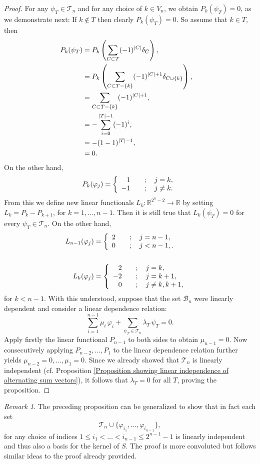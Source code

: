 \documentclass[12pt]{amsart}
\numberwithin{theorem}{section}
\theoremstyle{remark}
\newtheorem{remark}{Remark}[section]
\begin{document}
\begin{proof}
For any $\psi_T\in \mathcal T_n$ and for any choice of $k\in V_n$, we obtain $P_k(\psi_T) = 0$, as we demonstrate next: If $k\notin T$ then clearly $P_k(\psi_T)=0$. So assume that $k\in T$, then 
\begin{align*}
P_k(\psi_T) & = P_k\left(\sum _{C\subset T} (-1)^{|C|} \delta_C  \right), \cr
& = P_k\left(\sum _{C\subset T-\{k\}} (-1)^{|C|+1} \delta_{C\cup\{k\}}  \right), \cr
& = \sum _{C\subset T-\{k\}} (-1)^{|C|+1},   \cr
& = -\sum _{i=0}^{|T|-1} (-1)^i, \cr 
& = - (1-1)^{|T|-1},\cr
& = 0. 
\end{align*}  
On the other hand, 
$$P_k(\varphi_j) = \left\{ 
\begin{array}{rl}
1 & \quad ; \quad j=k, \cr
-1 & \quad ; \quad j\ne k.
\end{array} 
\right. 
$$
From this we define new linear functionals $L_k:\mathbb R^{2^n-2}\to \mathbb R$ by setting $L_k = P_k - P_{k+1}$, for $k=1,\dots, n-1$. Then it is still true that $L_k(\psi_T)=0$ for every $\psi _T\in \mathcal T_n$. On the other hand,   
\begin{align*}
L_{n-1}(\varphi_j) & = \left\{ 
\begin{array}{rl}
2 & \quad ; \quad j=n-1, \cr
0 & \quad ; \quad j< n-1,.
\end{array} 
\right. \cr
& \cr 
L_{k}(\varphi_j) & = \left\{ 
\begin{array}{rl}
2 & \quad ; \quad j=k, \cr
-2 & \quad ; \quad j=k+1, \cr
0 & \quad ; \quad j\ne k, k+1,
\end{array} 
\right.
\end{align*}
for $k<n-1$. With this understood, suppose that the set $\mathcal B_n$ were linearly dependent and consider a linear dependence relation:
$$\sum _{i=1}^{n-1}\mu_i\, \varphi_i + \sum _{\psi_T\in \mathcal T_n}\lambda _T\,  \psi_T = 0. $$
Apply firstly the linear functional $P_{n-1}$ to both sides to obtain $\mu_{n-1} = 0$. Now consecutively applying $P_{n-2}, \dots, P_1$ to the linear dependence relation further yields $\mu_{n-2} =0, \dots, \mu_1=0$. Since we already showed that $\mathcal T_n$ is linearly independent (cf. Proposition \ref{Proposition showing linear independence of alternating sum vectors}), it follows that $\lambda _T=0$ for all $T$, proving the proposition. 
\end{proof}
\begin{remark}
The preceding proposition can be generalized to show that in fact each set %
$$ \mathcal T_n \cup \{\varphi_{i_1}, \dots, \varphi_{i_{n-1}}\},$$
for any choice of indices $1\le i_1<\dots<i_{n-1}\le 2^{n-1}-1$ is linearly independent and thus also a basis for the kernel of $S$. The proof is more convoluted but follows similar ideas to the proof already provided. 
\end{remark}
\end{document}
